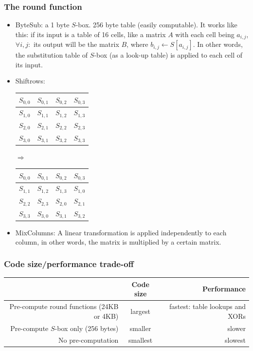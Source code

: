 \documentclass[12pt]{book}
\begin{document}
\subsubsection{The round function}
\begin{itemize}
	\item ByteSub: a 1 byte $S$-box. 256 byte table (easily computable). It works like this: if its input is a table of 16 cells, like a matrix $A$ with each cell being $a_{i,j}$, $\forall i,j:$ its output will be the matrix $B$, where $b_{i,j}\leftarrow S[a_{i,j}]$. In other words, the substitution table of $S$-box (as a look-up table) is applied to each cell of its input.
	\item Shiftrows: \begin{tabular}{|c|c|c|c|}
		\hline
		$S_{0,0}$&$S_{0,1}$&$S_{0,2}$&$S_{0,3}$\\\hline
		$S_{1,0}$&$S_{1,1}$&$S_{1,2}$&$S_{1,3}$\\\hline
		$S_{2,0}$&$S_{2,1}$&$S_{2,2}$&$S_{2,3}$\\\hline
		$S_{3,0}$&$S_{3,1}$&$S_{3,2}$&$S_{3,3}$\\\hline
	\end{tabular} $\Longrightarrow$ \begin{tabular}{|c|c|c|c|}
	\hline
	$S_{0,0}$&$S_{0,1}$&$S_{0,2}$&$S_{0,3}$\\\hline
	$S_{1,1}$&$S_{1,2}$&$S_{1,3}$&$S_{1,0}$\\\hline
	$S_{2,2}$&$S_{2,3}$&$S_{2,0}$&$S_{2,1}$\\\hline
	$S_{3,3}$&$S_{3,0}$&$S_{3,1}$&$S_{3,2}$\\\hline
\end{tabular}
	\item MixColumns: A linear transformation is applied independently to each column, in other words, the matrix is multiplied by a certain matrix.
\end{itemize}

\subsubsection{Code size/performance trade-off}
\begin{center}
	\begin{tabular}{N{.3}cN{.2}}
		\hline
		&\textbf{Code size}&\textbf{Performance}\\\hline
		Pre-compute round functions (24KB or 4KB) & largest & fastest: table lookups and XORs\\
		Pre-compute $S$-box only (256 bytes) & smaller & slower\\
		No pre-computation & smallest & slowest\\\hline
	\end{tabular}
\end{center}
\end{document}
